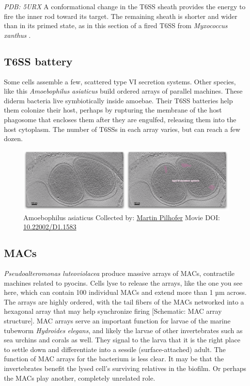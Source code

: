 \documentclass[]{tufte-book}
\begin{document}
\emph{PDB: 5URX} A conformational change in the T6SS sheath provides the
energy to fire the inner rod toward its target. The remaining sheath is
shorter and wider than in its primed state, as in this section of a
fired T6SS from \emph{Myxococcus xanthus} \citep{chang2017}.

\hypertarget{T6SS_battery}{\subsection{T6SS
battery}\label{T6SS_battery}}

Some cells assemble a few, scattered type VI secretion systems. Other
species, like this \emph{Amoebophilus asiaticus} build ordered arrays of
parallel machines. These diderm bacteria live symbiotically inside
amoebae. Their T6SS batteries help them colonize their host, perhaps by
rupturing the membrane of the host phagosome that encloses them after
they are engulfed, releasing them into the host cytoplasm. The number of
T6SSs in each array varies, but can reach a few dozen.





\begin{figure}
\includegraphics{movie_stills/9_7a} \caption[Amoebophilus asiaticus Collected by:
\protect\hyperlink{martin_pilhofer}{Martin Pilhofer} Movie DOI:
\href{https://doi.org/10.22002/D1.1583}{10.22002/D1.1583}]{Amoebophilus asiaticus Collected by:
\protect\hyperlink{martin_pilhofer}{Martin Pilhofer} Movie DOI:
\href{https://doi.org/10.22002/D1.1583}{10.22002/D1.1583}}\label{fig:9-7a}
\end{figure}

\hypertarget{MACs}{\subsection{MACs}\label{MACs}}

\emph{Pseudoalteromonas luteoviolacea} produce massive arrays of MACs,
contractile machines related to pyocins. Cells lyse to release the
arrays, like the one you see here, which can contain 100 individual MACs
and extend more than 1 µm across. The arrays are highly ordered, with
the tail fibers of the MACs networked into a hexagonal array that may
help synchronize firing {[}Schematic: MAC array structure{]}. MAC arrays
serve an important function for larvae of the marine tubeworm
\emph{Hydroides elegans}, and likely the larvae of other invertebrates
such as sea urchins and corals as well. They signal to the larva that it
is the right place to settle down and differentiate into a sessile
(surface-attached) adult. The function of MAC arrays for the bacterium
is less clear. It may be that the invertebrates benefit the lysed cell's
surviving relatives in the biofilm. Or perhaps the MACs play another,
completely unrelated role.
\end{document}

